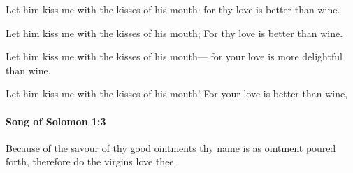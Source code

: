 			Let him kiss me with the kisses of his mouth: for thy love is better than wine.

			\begin{versebox}
					\item[BHS] 
					\item[LXX] 
					\item[ASV] Let him kiss me with the kisses of his mouth; For thy love is better than wine.
					\item[NIV] Let him kiss me with the kisses of his mouth— for your love is more delightful than wine.
					\item[NRSV] Let him kiss me with the kisses of his mouth! For your love is better than wine,
			\end{versebox}

		\paragraph{Song of Solomon 1:3} %
			\label{SONGOFSOLOMON-1-3}

			Because of the savour of thy good ointments thy name is as ointment poured forth, therefore do the virgins love thee.

